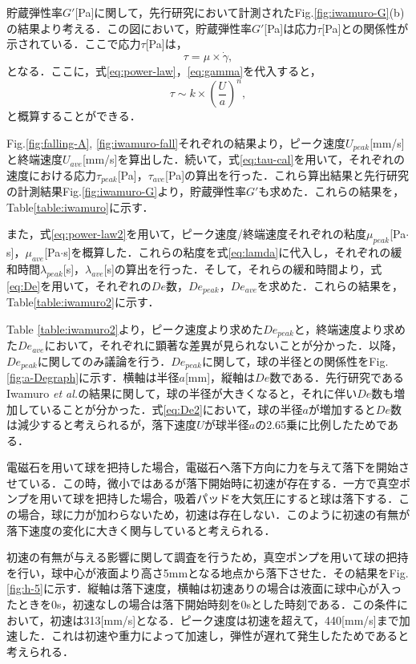 貯蔵弾性率$G'$[Pa]に関して，先行研究において計測されたFig.\ref{fig:iwamuro-G}(b)の結果より考える．この図において，貯蔵弾性率$G'$[Pa]は応力$\tau$[Pa]との関係性が示されている．ここで応力$\tau$[Pa]は，
\begin{equation}
    \tau = \mu \times \dot{\gamma} ,
    \label{eq:tau}
\end{equation}
となる．ここに，式\ref{eq:power-law}，\ref{eq:gamma}を代入すると，
\begin{equation}
    \tau \sim k \times \left(\frac{U}{a}\right)^n , 
    \label{eq:tau-cal}
\end{equation}
と概算することができる．

Fig.\ref{fig:falling-A}, \ref{fig:iwamuro-fall}それぞれの結果より，ピーク速度$U_{peak}$[mm/s]と終端速度$U_{ave}$[mm/s]を算出した．続いて，式\ref{eq:tau-cal}を用いて，それぞれの速度における応力$\tau_{peak}$[Pa]，$\tau_{ave}$[Pa]の算出を行った．これら算出結果と先行研究の計測結果Fig.\ref{fig:iwamuro-G}より，貯蔵弾性率$G'$も求めた．これらの結果を，Table\ref{table:iwamuro}に示す．

また，式\ref{eq:power-law2}を用いて，ピーク速度/終端速度それぞれの粘度$\mu_{peak}$[Pa$\cdot$s]，$\mu_{ave}$[Pa$\cdot$s]を概算した．これらの粘度を式\ref{eq:lamda}に代入し，それぞれの緩和時間$\lambda_{peak}$[s]，$\lambda_{ave}$[s]の算出を行った．そして，それらの緩和時間より，式\ref{eq:De}を用いて，それぞれの$De$数，$De_{peak}$，$De_{ave}$を求めた．これらの結果を，Table\ref{table:iwamuro2}に示す．

Table \ref{table:iwamuro2}より，ピーク速度より求めた$De_{peak}$と，終端速度より求めた$De_{ave}$において，それぞれに顕著な差異が見られないことが分かった．以降，$De_{peak}$に関してのみ議論を行う．$De_{peak}$に関して，球の半径との関係性をFig.\ref{fig:a-Degraph}に示す．横軸は半径$a$[mm]，縦軸は$De$数である．先行研究であるIwamuro \textit{et al.}\cite{ref:8}の結果に関して，球の半径が大きくなると，それに伴い$De$数も増加していることが分かった．式\ref{eq:De2}において，球の半径$a$が増加すると$De$数は減少すると考えられるが，落下速度$U$が球半径$a$の2.65乗に比例したためである．

電磁石を用いて球を把持した場合，電磁石へ落下方向に力を与えて落下を開始させている．この時，微小ではあるが落下開始時に初速が存在する．一方で真空ポンプを用いて球を把持した場合，吸着パッドを大気圧にすると球は落下する．この場合，球に力が加わらないため，初速は存在しない．このように初速の有無が落下速度の変化に大きく関与していると考えられる．

初速の有無が与える影響に関して調査を行うため，真空ポンプを用いて球の把持を行い，球中心が液面より高さ5mmとなる地点から落下させた．その結果をFig.\ref{fig:h-5}に示す．縦軸は落下速度，横軸は初速ありの場合は液面に球中心が入ったときを0s，初速なしの場合は落下開始時刻を0sとした時刻である．この条件において，初速は313[mm/s]となる．ピーク速度は初速を超えて，440[mm/s]まで加速した．これは初速や重力によって加速し，弾性が遅れて発生したためであると考えられる．

